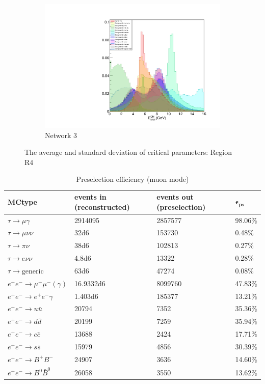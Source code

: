 \documentclass[12pt]{thesis}  %
\begin{document}
\begin{figure}
\begin{subfigure}[b]{0.475\textwidth}
            \includegraphics[width=\textwidth]{images/test.pdf}
            \caption[]%
            {{\small Network 3}}    
            \label{fig:mean and std of net34}
        \end{subfigure}
                \caption[ The average and standard deviation of critical parameters ]
        {\small The average and standard deviation of critical parameters: Region R4} 
    \end{figure}


\begin{table}[h]
\centering
\begin{tabular}{llll}
\textbf{MCtype} & \textbf{events in (reconstructed)} & \textbf{events out (preselection)} & $\mathbf{\epsilon_{\text{ps}}}$\\ \hline
\rowcolor[HTML]{EFEFEF}
$\tau\to\mu\gamma$ & 2914095 & 2857577 & 98.06\%	\\
$\tau\to\mu\nu\nu$ & \num{32d6} & 153730 & 0.48\%\\
$\tau\to\pi\nu$ & \num{38d6} & 102813 & 0.27\%\\
$\tau\to e\nu\nu$ & \num{4.8d6} & 13322 & 0.28\%\\
$\tau\to\text{generic}$ & \num{63d6} & 47274 & 0.08\%\\
$e^+ e^-\to\mu^+\mu^-(\gamma)$ & \num{16.9332d6} & 8099760 & 47.83\%	\\
$e^+ e^-\to e^+e^-\gamma$ & \num{1.403d6} & 185377 & 13.21\%	\\
$e^+ e^-\to u\bar{u}$ & 20794 & 7352 & 35.36\%	\\
$e^+ e^-\to d\bar{d}$ & 20199 & 7259 & 35.94\%	\\
$e^+ e^-\to c\bar{c}$ & 13688 & 2424 & 17.71\%	\\
$e^+ e^-\to s\bar{s}$ & 15979 & 4856 & 30.39\%	\\
$e^+ e^-\to B^+B^-$ & 24907 & 3636 & 14.60\%	\\
$e^+ e^-\to B^0 \bar{B}^0$ & 26058 & 3550 & 13.62\%
\end{tabular}
\caption{Preselection efficiency (muon mode)}
\label{my-label}
\end{table}
\end{document}

